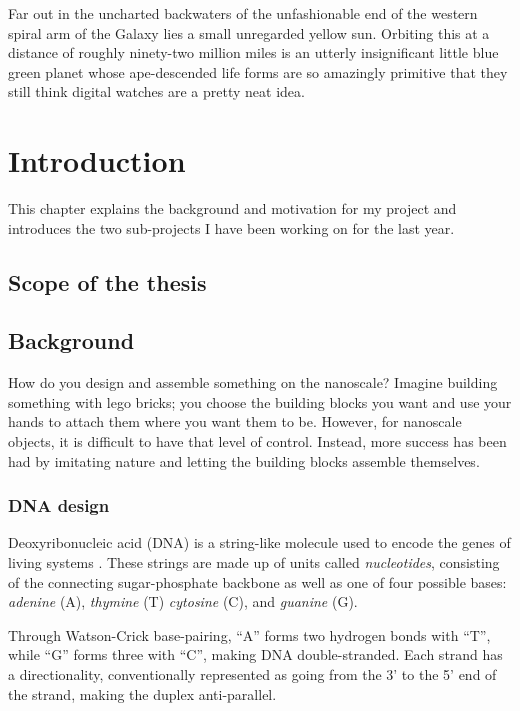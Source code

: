 \begin{savequote}[8cm]
Far out in the uncharted backwaters of the unfashionable end of the western spiral arm of the Galaxy lies a small unregarded yellow sun. Orbiting this at a distance of roughly ninety-two million miles is an utterly insignificant little blue green planet whose ape-descended life forms are so amazingly primitive that they still think digital watches are a pretty neat idea.
\end{savequote}

\chapter{Introduction}\label{ch:1-intro}

\minitoc

This chapter explains the background and motivation for my project and introduces the two sub-projects I have been working on for the last year.


\section{Scope of the thesis}

\section{Background}
How do you design and assemble something on the nanoscale? Imagine building something with lego bricks; you choose the building blocks you want and use your hands to attach them where you want them to be. However, for nanoscale objects, it is difficult to have that level of control. Instead, more success has been had by imitating nature and letting the building blocks assemble themselves.

\subsection{DNA design}
Deoxyribonucleic acid (DNA) is a string-like molecule used to encode the genes of living systems \cite{calladine1997understanding}. These strings are made up of units called \emph{nucleotides}, consisting of the connecting sugar-phosphate backbone as well as one of four possible bases: \emph{adenine} (A), \emph{thymine} (T) \emph{cytosine} (C), and \emph{guanine} (G).

Through Watson-Crick base-pairing, ``A'' forms two hydrogen bonds with ``T'', while ``G'' forms three with ``C'', making DNA double-stranded. Each strand has a directionality, conventionally represented as going from the 3' to the 5' end of the strand, making the duplex anti-parallel.


